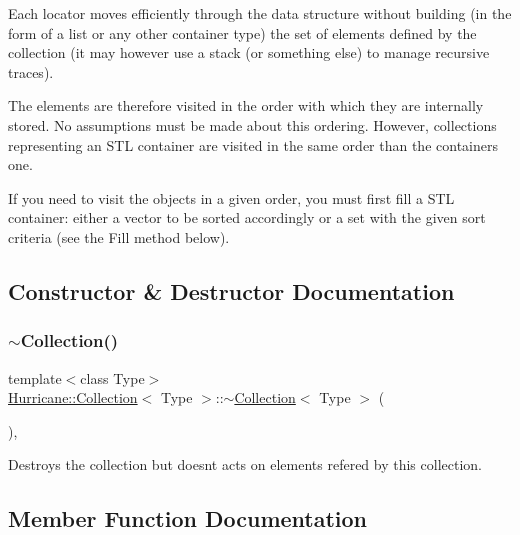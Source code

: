 Each locator moves efficiently through the data structure without building (in the form of a list or any other container type) the set of elements defined by the collection (it may however use a stack (or something else) to manage recursive traces).

The elements are therefore visited in the order with which they are internally stored. No assumptions must be made about this ordering. However, collections representing an S\+TL container are visited in the same order than the container\textquotesingle{}s one.

If you need to visit the objects in a given order, you must first fill a S\+TL container\+: either a vector to be sorted accordingly or a set with the given sort criteria (see the Fill method below). 

\subsection{Constructor \& Destructor Documentation}
\mbox{\label{classHurricane_1_1Collection_aafcf8e05658e245b2a762baa7a59f281}} 
\subsubsection{\texorpdfstring{$\sim$\+Collection()}{~Collection()}}
{\footnotesize\ttfamily template$<$class Type$>$ \\
\mbox{\hyperlink{classHurricane_1_1Collection}{Hurricane\+::\+Collection}}$<$ Type $>$\+::$\sim$\mbox{\hyperlink{classHurricane_1_1Collection}{Collection}}$<$ Type $>$ (\begin{DoxyParamCaption}{ }\end{DoxyParamCaption})\hspace{0.3cm}{\ttfamily [inline]}, {\ttfamily [virtual]}}

Destroys the collection but doesn\textquotesingle{}t acts on elements refered by this collection. 

\subsection{Member Function Documentation}
\mbox{\label{classHurricane_1_1Collection_ac75b91d3952b36e14f21174958523924}} 
